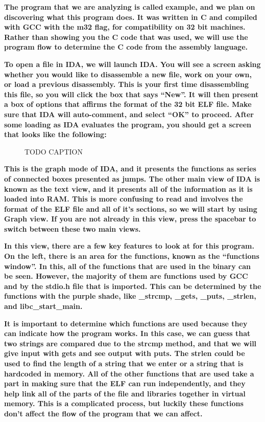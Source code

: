 \documentclass[letterpaper]{article}
\newcommand{\sitfig}[3]{
\begin{figure}[H]
\centering
\makebox[\textwidth][c]{
#2
}
\caption{#3}
\label{#1}
\end{figure}
}
\newcommand{\sitgfx}[4][scale=1.0]{
\sitfig{#3}{\texttt{[image: \#2]}}{#4}
}
\begin{document}
\textbf{The program that we are analyzing is called
}\textbf{\textcolor[rgb]{0.21960784,0.4627451,0.11372549}{example}}\textbf{, and we plan on discovering what this
program does. It was written in C and compiled with GCC with the m32 flag, for compatibility on 32 bit machines. Rather
than showing you the C code that was used, we will use the program flow to determine the C code from the assembly
language.}

\textbf{To open a file in IDA, we will launch IDA. You will see a screen asking whether you would like to disassemble a
new file, work on your own, or load a previous disassembly. This is your first time disassembling this file, so you
will click the box that says ``New''. It will then present a box of options that affirms the format of the 32 bit ELF
file. Make sure that IDA will auto-comment, and select ``OK'' to proceed. After some loading as IDA evaluates the
program, you should get a screen that looks like the following:}

  
\sitgfx[width=6.5in,height=4.0626in]{FINALWORKINGDOCFORMERLYPRECURSOR-img045.png}{fig:unk}{TODO CAPTION}
 \textbf{This is the graph mode of IDA, and it presents the functions as series of connected boxes presented as jumps.
The other main view of IDA is known as the text view, and it presents all of the information as it is loaded into RAM.
This is more confusing to read and involves the format of the ELF file and all of it's sections, so we will start by
using Graph view. If you are not already in this view, press the spacebar to switch between these two main views.}

\textbf{In this view, there are a few key features to look at for this program. On the left, there is an area for the
functions, known as the ``functions window''. In this, all of the functions that are used in the binary can be seen.
However, the majority of them are functions used by GCC and by the stdio.h file that is imported. This can be
determined by the functions with the purple shade, like \_strcmp, \_gets, \_puts, \_strlen, and libc\_start\_main.}

\textbf{It is important to determine which functions are used because they can indicate how the program works. In this
case, we can guess that two strings are compared due to the strcmp method, and that we will give input with gets and
see output with puts. The strlen could be used to find the length of a string that we enter or a string that is
hardcoded in memory. All of the other functions that are used take a part in making sure that the ELF can run
independently, and they help link all of the parts of the file and libraries together in virtual memory. This is a
complicated process, but luckily these functions don't affect the flow of the program that we can affect.}
\end{document}
